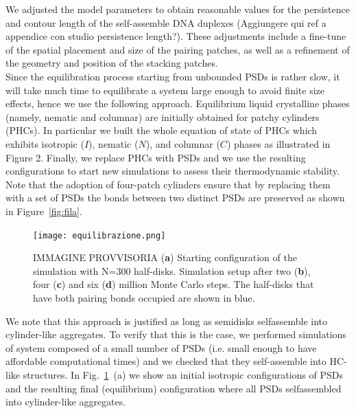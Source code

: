 \documentclass[aip,jcp, amsmath, amssymb, reprint]{revtex4-1}
\begin{document}
We adjusted the model parameters to obtain reasonable values for the persistence and contour length of the self-assemble 
DNA duplexes ({\color{red}Aggiungere qui ref a appendice con studio persistence length?}). These adjustments include a fine-tune of the spatial placement and size of 
the pairing patches, as well as a refinement of the geometry and position of the stacking patches. \\

Since the equilibration process starting from unbounded PSDs is rather slow, 
it will take much time to equilibrate a system large enough to avoid finite size
effects, hence we use the following approach.
Equilibrium liquid crystalline phases (namely, nematic and columnar) are 
initially obtained for patchy cylinders (PHCs). 
In particular we built the whole equation of state of PHCs which exhibits
isotropic ($I$), nematic ($N$), and columnar ($C$) phases as illustrated in Figure 2.
Finally, we replace PHCs with PSDs and we use the resulting configurations
to start new simulations to assess their thermodynamic stability. 
Note that the adoption of four-patch cylinders ensure that by replacing
them with a set of PSDs the bonds between two distinct PSDs are preserved as shown in Figure~\ref{fig:fila}.
\begin{figure}[h!]
\texttt{[image: equilibrazione.png]}
\caption{\label{fig:sdselfass} IMMAGINE PROVVISORIA (\textbf{a}) Starting configuration of the simulation with N=300 half-disks. Simulation setup after two (\textbf{b}), four (\textbf{c}) and six (\textbf{d}) million Monte Carlo steps. The half-disks that have both pairing bonds occupied are shown in blue.}
\end{figure}


We note that this approach is justified as long as semidisks selfassemble into cylinder-like aggregates. To verify that this is the case, we performed simulations
of system composed of a small number of PSDs (i.e. small enough to have affordable
computational times) and we checked that they self-assemble into HC-like structures.
In Fig.~\ref{fig:sdselfass}~(a) we show an initial isotropic configurations of PSDs and the resulting final 
(equilibrium) configuration where all PSDs selfassembled into cylinder-like
aggregates. 
\end{document}
